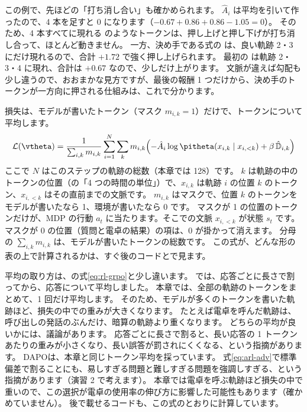 この例で、先ほどの「打ち消し合い」も確かめられます。
$\hat A_i$ は平均を引いて作ったので、4 本を足すと 0 になります（$-0.67+0.86+0.86-1.05=0$）。
そのため、4 本すべてに現れる  のようなトークンは、押し上げと押し下げが打ち消し合って、ほとんど動きません。
一方、決め手である式の \code{+} は、良い軌跡 2・3 にだけ現れるので、合計 $+1.72$ で強く押し上げられます。
最初の  は軌跡 2・3・4 に現れ、合計は $+0.67$ なので、少しだけ上がります。
文脈が違えば勾配も少し違うので、おおまかな見方ですが、最後の報酬 1 つだけから、決め手のトークンが一方向に押される仕組みは、これで分かります。

損失は、モデルが書いたトークン（マスク $m_{i,k}=1$）だけで、トークンについて平均します。
\begin{equation}
\mathcal{L}(\vtheta)=\frac{1}{\sum_{i,k}m_{i,k}}\sum_{i=1}^{N}\sum_{k}m_{i,k}
\Bigl(-\hat A_i\log\pitheta(x_{i,k}\mid x_{i,<k})+\beta\,\hat{\mathbb{D}}_{i,k}\Bigr)
\label{eq:arl-loss}
\end{equation}
ここで $N$ はこのステップの軌跡の総数（本章では 128）です。
$k$ は軌跡の中のトークンの位置（の「4 つの時間の単位」）で、$x_{i,k}$ は軌跡 $i$ の位置 $k$ のトークン、$x_{i,<k}$ はその直前までの文脈です。
$m_{i,k}$ はマスクで、位置 $k$ のトークンをモデルが書いたなら 1、環境が書いたなら 0 です。
マスクが 1 の位置のトークンだけが、MDP の行動 $a_t$ に当たります。そこでの文脈 $x_{i,<k}$ が状態 $s_t$ です。
マスクが 0 の位置（質問と電卓の結果）の項は、0 が掛かって消えます。
分母の $\sum_{i,k}m_{i,k}$ は、モデルが書いたトークンの総数です。
この式が、どんな形の表の上で計算されるかは、すぐ後のコードとで見ます。

平均の取り方は、の式\eqref{eq:rl-grpo}と少し違います。
では、応答ごとに長さで割ってから、応答について平均しました。
本章では、全部の軌跡のトークンをまとめて、1 回だけ平均します。
そのため、モデルが多くのトークンを書いた軌跡ほど、損失の中での重みが大きくなります。
たとえば電卓を呼んだ軌跡は、呼び出しの発話のぶんだけ、暗算の軌跡より重くなります。
どちらの平均が良いかには、議論があります。
応答ごとに長さで割ると、長い応答の 1 トークンあたりの重みが小さくなり、長い誤答が罰されにくくなる、という指摘があります\cite{liu2025understanding}。
DAPO\cite{yu2025dapo}は、本章と同じトークン平均を採っています。
式\eqref{eq:arl-adv}で標準偏差で割ることにも、易しすぎる問題と難しすぎる問題を強調しすぎる、という指摘があります\cite{liu2025understanding}（演習 2 で考えます）。
本章では電卓を呼ぶ軌跡ほど損失の中で重いので、この選択が電卓の使用率の伸び方に影響した可能性もあります（確かめていません）。
後で載せるコードも、この式のとおりに計算しています。

